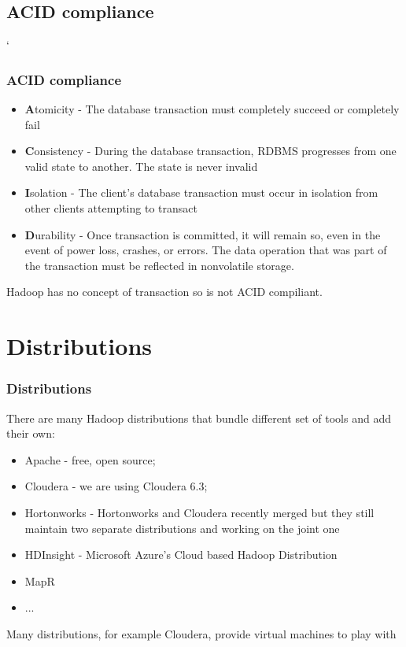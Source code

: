 \documentclass{beamer}
\begin{document}
\subsection{ACID compliance}
\begin{frame}
`\frametitle{ACID compliance}
\begin{itemize}
  \item {\color{mycolordef}\textbf{A}}tomicity - The database transaction must completely succeed or completely fail
  \item {\color{mycolordef}\textbf{C}}onsistency - During the database transaction, RDBMS progresses from one valid state to another. The state is never invalid
  \item {\color{mycolordef}\textbf{I}}solation - The client's database transaction must occur in isolation from other clients attempting to transact
  \item {\color{mycolordef}\textbf{D}}urability - Once transaction is committed, it will remain so, 
    even in the event of power loss, crashes, or errors. The data operation that was part of the transaction must be reflected in nonvolatile storage. 
\end{itemize}

Hadoop has no concept of transaction so is not ACID compiliant.

\end{frame}

\section{Distributions}
\begin{frame}
 \frametitle{Distributions}
 There are many Hadoop distributions that bundle different set of tools and add their own:
 \begin{itemize}
  \item {\color{mycolordef}Apache}  - free, open source;
  \item {\color{mycolordef}Cloudera} - we are using Cloudera 6.3;
  \item {\color{mycolordef}Hortonworks} - Hortonworks and Cloudera recently merged but they still maintain two separate distributions and working on the joint one
  \item {\color{mycolordef}HDInsight} - Microsoft  Azure's Cloud based Hadoop Distribution
  \item {\color{mycolordef}MapR}
  \item ...
  \end{itemize}
  Many distributions, for example Cloudera, provide virtual machines to play with
\end{frame}
\end{document}
